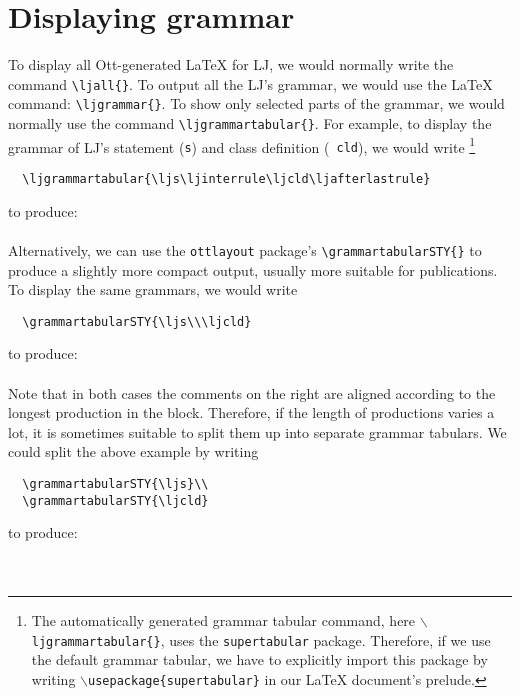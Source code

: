 \documentclass{article}
\begin{document}
\section{Displaying grammar}
%
To display all Ott-generated \LaTeX{} for LJ, we would normally write the command
\verb+\ljall{}+. To output all the LJ's grammar, we would use the \LaTeX{}
command: \verb+\ljgrammar{}+. To show only selected parts of the grammar, we
would normally use the command \verb+\ljgrammartabular{}+. For example, to
display the grammar of LJ's statement ({\tt s}) and class definition ({\tt
  cld}), we would write
\footnote{The automatically generated grammar tabular command, here \texttt{$\backslash{}$ljgrammartabular\{\}}, uses the {\tt supertabular} package. Therefore, if we use the
default grammar tabular, we have to explicitly import this package by writing
\texttt{$\backslash{}$usepackage\{supertabular\}} in our \LaTeX{} document's prelude.}
%
\begin{verbatim}
  \ljgrammartabular{\ljs\ljinterrule\ljcld\ljafterlastrule}
\end{verbatim}
%
to produce:\\[2ex]
\ljgrammartabular{\ljs\ljinterrule\ljcld\ljafterlastrule}\\[2ex]


Alternatively, we can use the \texttt{ottlayout} package's
\verb+\grammartabularSTY{}+ to produce a slightly more compact output, usually
more suitable for publications. To display the same grammars, we would write
%
\begin{verbatim}
  \grammartabularSTY{\ljs\\\ljcld}
\end{verbatim}
%
to produce:\\[2ex]
\grammartabularSTY{\ljs\\\ljcld}\\[2ex]

Note that in both cases the comments on the right are aligned according to the
longest production in the block. Therefore, if the length of productions varies
a lot, it is sometimes suitable to split them up into separate grammar
tabulars. We could split the above example by writing
%
\begin{verbatim}
  \grammartabularSTY{\ljs}\\
  \grammartabularSTY{\ljcld}
\end{verbatim}
%
to produce:\\[2ex]
\grammartabularSTY{\ljs}\\
\grammartabularSTY{\ljcld}\\[2ex]
\end{document}
